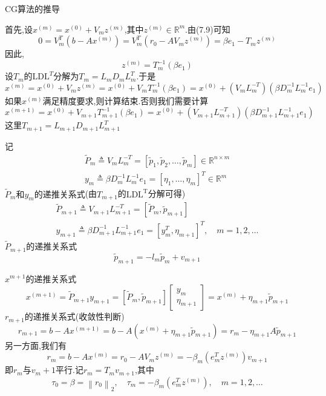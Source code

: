 \documentclass[notheorems,serif]{beamer}
\renewcommand{\normalsize}{\wuhao}
\newcommand{\wuhao}{\fontsize{10.5pt}{\baselineskip}\selectfont}
\begin{document}
\begin{frame}


{\color{blue}\Large CG算法的推导}

\quad

\normalsize
首先,设$x^{(m)}=x^{(0)}+V_{m} z^{(m)}$,其中$z^{(m)} \in \mathbb{R}^{m}$.由(7.9)可知
$$
0=V_{m}^{T}\left(b-A x^{(m)}\right)=V_{m}^{T}\left(r_{0}-A V_{m} z^{(m)}\right)=\beta e_{1}-T_{m} z^{(m)}
$$
因此,
$$
z^{(m)}=T_{m}^{-1}\left(\beta e_{1}\right)
$$
设$T_{m}$的$\mathrm{LDL}^{T}$分解为$T_{m}=L_{m} D_{m} L_{m}^{T}$.于是
$$
x^{(m)}=x^{(0)}+V_{m} z^{(m)}=x^{(0)}+V_{m} T_{m}^{-1}\left(\beta e_{1}\right)=x^{(0)}+\left(V_{m} L_{m}^{-T}\right)\left(\beta D_{m}^{-1} L_{m}^{-1} e_{1}\right)
$$
如果$x^{(m)}$满足精度要求,则计算结束.否则我们需要计算
$$
x^{(m+1)}=x^{(0)}+V_{m+1} T_{m+1}^{-1}\left(\beta e_{1}\right)=x^{(0)}+\left(V_{m+1} L_{m+1}^{-T}\right)\left(\beta D_{m+1}^{-1} L_{m+1}^{-1} e_{1}\right)
$$
这里$T_{m+1}=L_{m+1} D_{m+1} L_{m+1}^{T}$\\
\end{frame}

\begin{frame}
记
$$
\begin{array}{l}{\tilde{P}_{m} \triangleq V_{m} L_{m}^{-T}=\left[\tilde{p}_{1}, \tilde{p}_{2}, \ldots, \tilde{p}_{m}\right] \in \mathbb{R}^{n \times m}} \\ 
{y_{m} \triangleq \beta D_{m}^{-1} L_{m}^{-1} e_{1}=\left[\eta_{1}, \ldots, \eta_{m}\right]^{T} \in \mathbb{R}^{m}}\end{array}
$$
{\color{blue}$\tilde{P}_{m}$和$y_{m}$的递推关系式}(由$T_{m+1}$的$\mathrm{LDL}^{\mathrm{T}}$分解可得)
$$
\begin{array}{l}{\tilde{P}_{m+1} \triangleq V_{m+1} L_{m+1}^{-T}=\left[\tilde{P}_{m}, \tilde{p}_{m+1}\right]} \\ {y_{m+1} \triangleq \beta D_{m+1}^{-1} L_{m+1}^{-1} e_{1}=\left[y_{m}^{T}, \eta_{m+1}\right]^{T}, \quad m=1,2, \ldots}\end{array}
$$
{\color{blue}$\tilde{P}_{m+1}$的递推关系式}
$$
\tilde{p}_{m+1}=-l_{m} \tilde{p}_{m}+v_{m+1}
$$
\end{frame}

\begin{frame}


{\color{blue}$x^{m+1}$的递推关系式}
$$
x^{(m+1)}=\tilde{P}_{m+1} y_{m+1}=\left[\tilde{P}_{m}, \tilde{p}_{m+1}\right]\left[\begin{array}{c}{y_{m}} \\ {\eta_{m+1}}\end{array}\right]=x^{(m)}+\eta_{m+1} \tilde{p}_{m+1}
$$
{\color{blue}$r_{m+1}$的递推关系式(收敛性判断)}
$$
r_{m+1}=b-A x^{(m+1)}=b-A\left(x^{(m)}+\eta_{m+1} \tilde{p}_{m+1}\right)=r_{m}-\eta_{m+1} A \tilde{p}_{m+1}
$$
另一方面,我们有
$$
r_{m}=b-A x^{(m)}=r_{0}-A V_{m} z^{(m)}=-\beta_{m}\left(e_{m}^{T} z^{(m)}\right) v_{m+1}
$$
即$r_m$与$v_m+1$平行.记{\color{blue}$r_{m}=T_{m} v_{m+1}$},其中
$$
\tau_{0}=\beta=\left\|r_{0}\right\|_{2}, \quad \tau_{m}=-\beta_{m}\left(e_{m}^{T} z^{(m)}\right), \quad m=1,2, \ldots
$$
\end{frame}
\end{document}
